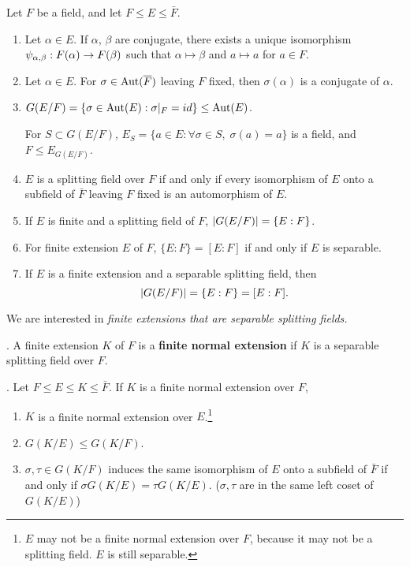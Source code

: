 \recall Let \(F\) be a field, and let \(F \leq E \leq \bar{F}\).
\begin{enumerate}
    \item Let \(\alpha \in E\). If \(\alpha\), \(\beta\) are conjugate, there exists a unique isomorphism \(\psi_{\alpha, \beta} : F(\alpha) \rightarrow F(\beta)\) such that \(\alpha \mapsto \beta\) and \(a \mapsto a\) for \(a \in F\).

    \item Let \(\alpha \in E\). For \(\sigma \in \Aut(\bar{F})\) leaving \(F\) fixed, then \(\sigma(\alpha)\) is a conjugate of \(\alpha\).

    \item \(G(E/F) = \{\sigma \in \mathrm{Aut}(E) : \sigma |_F = id\} \leq \mathrm{Aut}(E)\).

          For \(S \subset G(E/F)\), \(E_S = \{a \in E : \forall \sigma \in S,\; \sigma(a) = a\}\) is a field, and \(F \leq E_{G(E/F)}\).

    \item \(E\) is a splitting field over \(F\) if and only if every isomorphism of \(E\) onto a subfield of \(\bar{F}\) leaving \(F\) fixed is an automorphism of \(E\).

    \item If \(E\) is finite and a splitting field of \(F\), \(\left| G(E/F) \right| = \{E : F\}\).

    \item For finite extension \(E\) of \(F\), \(\{E : F\} = [E : F]\) if and only if \(E\) is separable.

    \item If \(E\) is a finite extension and a separable splitting field, then
          \[
              \left| G(E/F) \right| = \{E : F\} = [E : F].
          \]
\end{enumerate}

We are interested in \textit{finite extensions that are separable splitting fields.}

.  A finite extension \(K\) of \(F\) is a \textbf{finite normal extension} if \(K\) is a separable splitting field over \(F\).

\thm. Let \(F \leq E \leq K \leq \bar{F}\). If \(K\) is a finite normal extension over \(F\),
\begin{enumerate}
    \item \(K\) is a finite normal extension over \(E\).\footnote{\(E\) may not be a finite normal extension over \(F\), because it may not be a splitting field. \(E\) is still separable.}
    \item \(G(K/E) \leq G(K/F)\).
    \item \(\sigma, \tau \in G(K/F)\) induces the same isomorphism of \(E\) onto a subfield of \(\bar{F}\) if and only if \(\sigma G(K/E) = \tau G(K/E)\). (\(\sigma, \tau\) are in the same left coset of \(G(K/E)\))
\end{enumerate}

